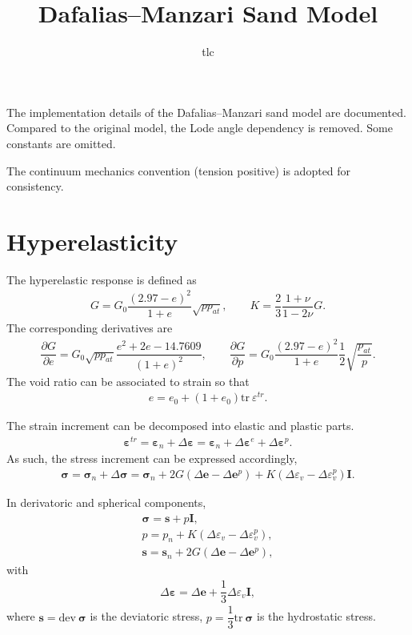 \documentclass[11pt,a4paper]{article}
\title{Dafalias--Manzari Sand Model}
\author{tlc}
\newcommand*{\tr}[1]{\mathrm{tr}~#1}
\newcommand*{\dev}[1]{\mathrm{dev}~#1}
\newcommand*{\pfrac}[2]{\dfrac{\partial#1}{\partial#2}}
\begin{document}
\maketitle
The implementation details of the Dafalias--Manzari sand model are documented. Compared to the original model, the Lode angle dependency is removed. Some constants are omitted.

The continuum mechanics convention (tension positive) is adopted for consistency.
\section{Hyperelasticity}
The hyperelastic response is defined as
\begin{gather}
G=G_0\dfrac{\left(2.97-e\right)^2}{1+e}\sqrt{pp_{at}},\qquad
K=\dfrac{2}{3}\dfrac{1+\nu}{1-2\nu}G.
\end{gather}
The corresponding derivatives are
\begin{gather}
\pfrac{G}{e}=G_0\sqrt{pp_{at}}\dfrac{e^2+2e-14.7609}{(1+e)^2},\qquad
\pfrac{G}{p}=G_0\dfrac{\left(2.97-e\right)^2}{1+e}\dfrac{1}{2}\sqrt{\dfrac{p_{at}}{p}}.
\end{gather}
The void ratio can be associated to strain so that
\begin{gather}
e=e_0+\left(1+e_0\right)\tr{\varepsilon^{tr}}.
\end{gather}

The strain increment can be decomposed into elastic and plastic parts.
\begin{gather}
\mathbold{\varepsilon}^{tr}=\mathbold{\varepsilon}_n+\Delta\mathbold{\varepsilon}=\mathbold{\varepsilon}_n+\Delta\mathbold{\varepsilon}^{e}+\Delta\mathbold{\varepsilon}^{p}.
\end{gather}
As such, the stress increment can be expressed accordingly,
\begin{gather}
\mathbold{\sigma}=\mathbold{\sigma}_n+\Delta\mathbold{\sigma}=\mathbold{\sigma}_n+2G\left(\Delta{}\mathbold{e}-\Delta{}\mathbold{e}^{p}\right)+K\left(\Delta\varepsilon_v-\Delta\varepsilon_v^p\right)\mathbold{I}.
\end{gather}

In derivatoric and spherical components,
\begin{gather}
\mathbold{\sigma}=\mathbold{s}+p\mathbold{I},\\
p=p_n+K\left(\Delta\varepsilon_v-\Delta\varepsilon_v^p\right),\\
\mathbold{s}=\mathbold{s}_n+2G\left(\Delta{}\mathbold{e}-\Delta{}\mathbold{e}^{p}\right),
\end{gather}
with
\begin{gather}
\Delta\mathbold{\varepsilon}=\Delta{}\mathbold{e}+\dfrac{1}{3}\Delta\varepsilon_v\mathbold{I},
\end{gather}
where $\mathbold{s}=\dev{\mathbold{\sigma}}$ is the deviatoric stress, $p=\dfrac{1}{3}\tr{\mathbold{\sigma}}$ is the hydrostatic stress.
\end{document}
